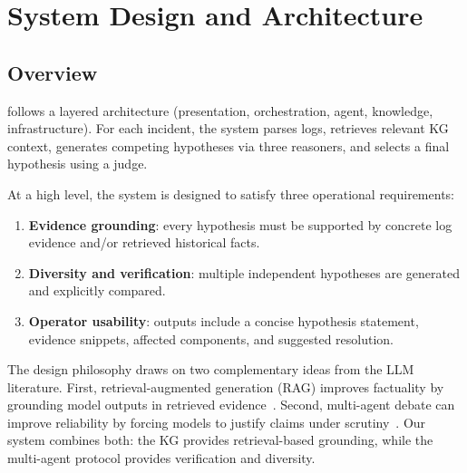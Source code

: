 
\chapter{System Design and Architecture}

\section{Overview}
\systemname{} follows a layered architecture (presentation, orchestration, agent, knowledge,
infrastructure). For each incident, the system parses logs, retrieves relevant KG context,
generates competing hypotheses via three reasoners, and selects a final hypothesis using a judge.

At a high level, the system is designed to satisfy three operational requirements:
\begin{enumerate}
  \item \textbf{Evidence grounding}: every hypothesis must be supported by concrete log evidence
        and/or retrieved historical facts.
  \item \textbf{Diversity and verification}: multiple independent hypotheses are generated and
        explicitly compared.
  \item \textbf{Operator usability}: outputs include a concise hypothesis statement, evidence
        snippets, affected components, and suggested resolution.
\end{enumerate}

The design philosophy draws on two complementary ideas from the LLM literature. First,
retrieval-augmented generation (RAG) improves factuality by grounding model outputs in retrieved
evidence~\cite{lewis2021retrievalaugmentedgenerationknowledgeintensivenlp}. Second, multi-agent
debate can improve reliability by forcing models to justify claims under
scrutiny~\cite{du2023improvingfactualityreasoninglanguage}. Our system combines both: the KG
provides retrieval-based grounding, while the multi-agent protocol provides verification and
diversity.

